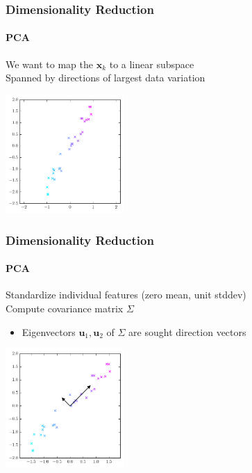 \documentclass[xetex,professionalfont]{beamer}
\renewcommand{\vec}[1]{\ensuremath{\mathbf{#1}}}
\newcommand{\vu}{\vec{u}}
\newcommand{\vx}{\vec{x}}
\begin{document}
\begin{frame}
\frametitle{Dimensionality Reduction}
\framesubtitle{PCA}

We want to map the $\vx_k$ to a linear subspace\\\medskip
Spanned by directions of largest data variation

\begin{center}
\includegraphics[width=4.5cm]{figures/pca-original.pdf}
\end{center}

\end{frame}


\begin{frame}
\frametitle{Dimensionality Reduction}
\framesubtitle{PCA}

Standardize individual features (zero mean, unit stddev)\\\medskip  %
Compute covariance matrix $\Sigma$
\begin{itemize}
    \item Eigenvectors $\vu_1,\vu_2$ of $\Sigma$ are sought direction vectors
\end{itemize}

\begin{center}
\includegraphics[width=4.5cm]{figures/pca-eigenvectors.pdf}
\end{center}

\end{frame}
\end{document}
